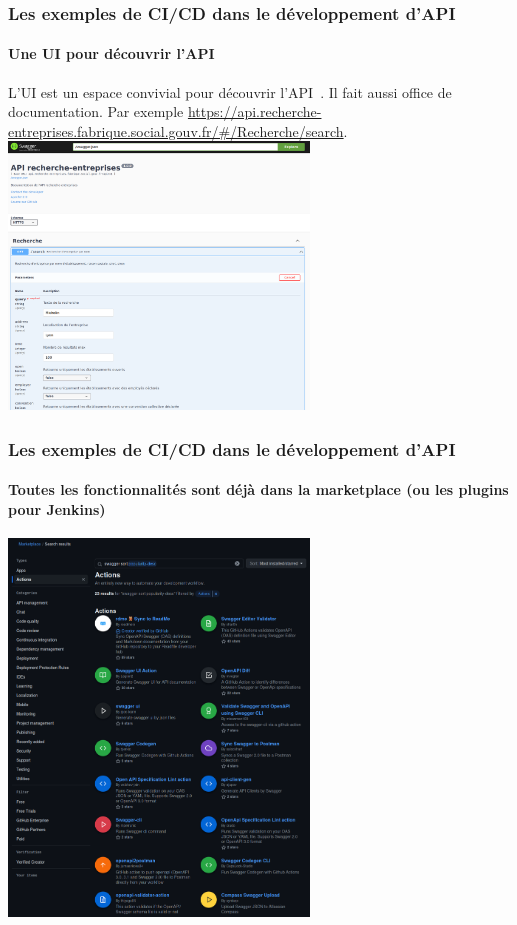 \documentclass{beamer}
\begin{document}
    \begin{frame}
        \frametitle{Les exemples de CI/CD dans le développement d'API}
        \framesubtitle{Une UI pour découvrir l'API}
        \transdissolve
        L'UI est un espace convivial pour découvrir l'API~.
        Il fait aussi office de documentation.
        Par exemple \url{https://api.recherche-entreprises.fabrique.social.gouv.fr/\#/Recherche/search}.
        \bigbreak
        \centering
        \includegraphics[width=8cm]{image/swagger-ui}
    \end{frame}

    \begin{frame}
        \frametitle{Les exemples de CI/CD dans le développement d'API}
        \framesubtitle{Toutes les fonctionnalités sont déjà dans la marketplace (ou les plugins pour Jenkins)}
        \transdissolve
        \centering
        \includegraphics[width=8cm]{image/swagger-worflows}
    \end{frame}
\end{document}
